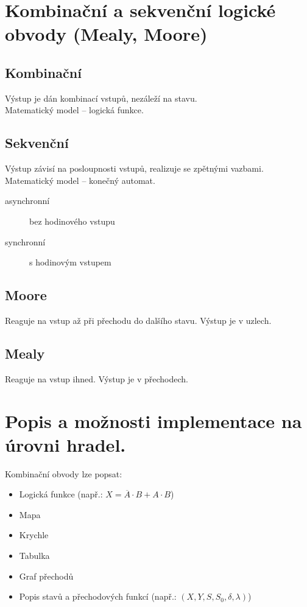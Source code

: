 \documentclass{szzclass}
\begin{document}
\tableofcontents
\newpage

\section{Kombinační a sekvenční logické obvody (Mealy, Moore)}
\subsection{Kombinační}
Výstup je dán kombinací vstupů, nezáleží na stavu. \\
Matematický model -- logická funkce.
\subsection{Sekvenční}
Výstup závisí na posloupnosti vstupů, realizuje se zpětnými vazbami. \\
Matematický model -- konečný automat.
\begin{description}
\item[asynchronní] bez hodinového vstupu
\item[synchronní] s hodinovým vstupem
\end{description}

\subsection{Moore}
Reaguje na vstup až při přechodu do dalšího stavu. Výstup je v uzlech.

\subsection{Mealy}
Reaguje na vstup ihned. Výstup je v přechodech.

\section{Popis a možnosti implementace na úrovni hradel.}
Kombinační obvody lze popsat:
\begin{itemize}
  \item Logická funkce (např.: $X = \overline{A}\cdot B + A\cdot B$)
  \item Mapa
  \item Krychle
  \item Tabulka
  \item Graf přechodů
  \item Popis stavů a přechodových funkcí (např.: $(X,Y,S,S_0,\delta,\lambda)$)
\end{itemize}
\end{document}
